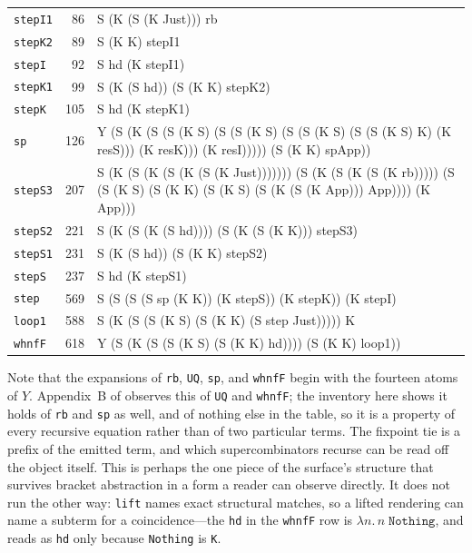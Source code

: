 \documentclass[english,submission,code=tt]{programming}
\begin{document}
\begin{table}[htb!]
\begin{tabular}{@{}l r >{\raggedright\arraybackslash\ttfamily}p{\dimexpr\linewidth-78pt\relax}@{}}
\midrule
\texttt{stepI1} & 86 & S (K (S (K Just))) rb \\
\texttt{stepK2} & 89 & S (K K) stepI1 \\
\texttt{stepI} & 92 & S hd (K stepI1) \\
\texttt{stepK1} & 99 & S (K (S hd)) (S (K K) stepK2) \\
\texttt{stepK} & 105 & S hd (K stepK1) \\
\texttt{sp} & 126 & Y (S (K (S (S (K S) (S (S (K S) (S (S (K S) (S (S (K S) K) (K resS))) (K resK))) (K resI))))) (S (K K) spApp)) \\
\texttt{stepS3} & 207 & S (K (S (K (S (K (S (K Just))))))) (S (K (S (K (S (K rb))))) (S (S (K S) (S (K K) (S (K S) (S (K (S (K App))) App)))) (K App))) \\
\texttt{stepS2} & 221 & S (K (S (K (S hd)))) (S (K (S (K K))) stepS3) \\
\texttt{stepS1} & 231 & S (K (S hd)) (S (K K) stepS2) \\
\texttt{stepS} & 237 & S hd (K stepS1) \\
\texttt{step} & 569 & S (S (S (S sp (K K)) (K stepS)) (K stepK)) (K stepI) \\
\texttt{loop1} & 588 & S (K (S (S (K S) (S (K K) (S step Just))))) K \\
\texttt{whnfF} & 618 & Y (S (K (S (S (K S) (S (K K) hd)))) (S (K K) loop1)) \\
\bottomrule
\end{tabular}
\end{table}

\noindent
Note that the expansions of \texttt{rb}, \texttt{UQ}, \texttt{sp}, and 
\texttt{whnfF} begin with the fourteen atoms of $Y$.  Appendix~B of 
\citet{Davis2027} observes this of \texttt{UQ} and \texttt{whnfF}; the 
inventory here shows it holds of \texttt{rb} and \texttt{sp} as well, 
and of nothing else in the table, so it is a property of every 
recursive equation rather than of two particular terms.  The fixpoint 
tie is a prefix of the emitted term, and which supercombinators recurse 
can be read off the object itself.  This is perhaps the one piece of 
the surface's structure that survives bracket abstraction in a form a 
reader can observe directly.  It does not run the other way: 
\texttt{lift} names exact structural matches, so a lifted rendering can 
name a subterm for a coincidence---the \texttt{hd} in the 
\texttt{whnfF} row is $\lambda n.\,n\;\texttt{Nothing}$, and reads as 
\texttt{hd} only because \texttt{Nothing} is \texttt{K}.
\end{document}

